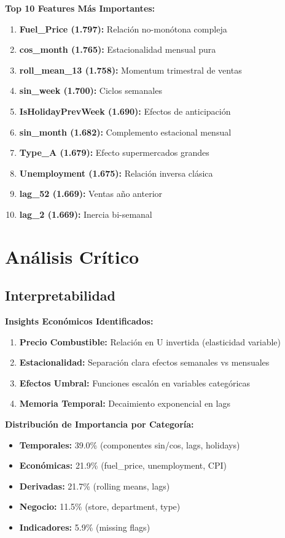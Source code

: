 \documentclass[10pt,twocolumn]{article}
\begin{document}
\textbf{Top 10 Features Más Importantes:}
\begin{enumerate}
    \item \textbf{Fuel\_Price (1.797):} Relación no-monótona compleja
    \item \textbf{cos\_month (1.765):} Estacionalidad mensual pura  
    \item \textbf{roll\_mean\_13 (1.758):} Momentum trimestral de ventas
    \item \textbf{sin\_week (1.700):} Ciclos semanales
    \item \textbf{IsHolidayPrevWeek (1.690):} Efectos de anticipación
    \item \textbf{sin\_month (1.682):} Complemento estacional mensual
    \item \textbf{Type\_A (1.679):} Efecto supermercados grandes
    \item \textbf{Unemployment (1.675):} Relación inversa clásica
    \item \textbf{lag\_52 (1.669):} Ventas año anterior
    \item \textbf{lag\_2 (1.669):} Inercia bi-semanal
\end{enumerate}

\section{Análisis Crítico}

\subsection{Interpretabilidad}

\textbf{Insights Económicos Identificados:}
\begin{enumerate}
    \item \textbf{Precio Combustible:} Relación en U invertida (elasticidad variable)
    \item \textbf{Estacionalidad:} Separación clara efectos semanales vs mensuales
    \item \textbf{Efectos Umbral:} Funciones escalón en variables categóricas
    \item \textbf{Memoria Temporal:} Decaimiento exponencial en lags
\end{enumerate}

\textbf{Distribución de Importancia por Categoría:}
\begin{itemize}
    \item \textbf{Temporales:} 39.0\% (componentes sin/cos, lags, holidays)
    \item \textbf{Económicas:} 21.9\% (fuel\_price, unemployment, CPI)
    \item \textbf{Derivadas:} 21.7\% (rolling means, lags)  
    \item \textbf{Negocio:} 11.5\% (store, department, type)
    \item \textbf{Indicadores:} 5.9\% (missing flags)
\end{itemize}
\end{document}
